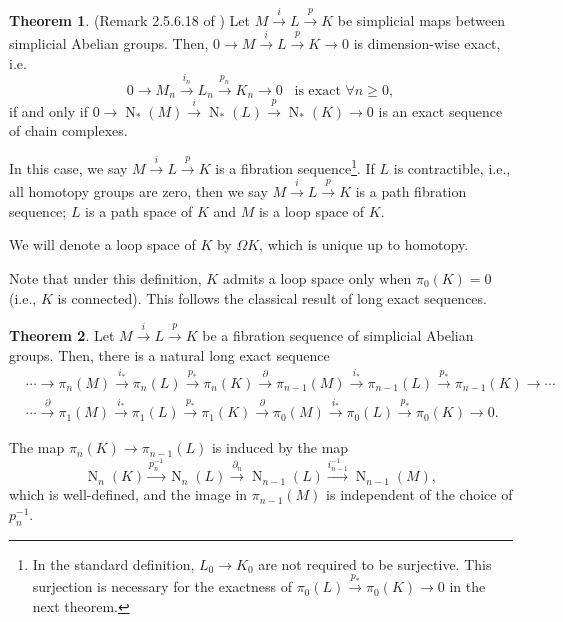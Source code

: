 \documentclass[reprint, amsmath, amssymb, showpacs, floatfix, longbibliography, aps, twocolumn, superscriptaddress, nofootinbib]{revtex4-2}
\theoremstyle{definition}
\newtheorem{theorem}{Theorem}[section]
\begin{document}
\begin{theorem}\label{thmFibration}
	(Remark 2.5.6.18 of \cite{kerodon}) Let $M\xrightarrow{i}L\xrightarrow{p}K$ be simplicial maps between simplicial Abelian groups. Then, $0\rightarrow M\xrightarrow{i}L\xrightarrow{p}K\rightarrow0$ is dimension-wise exact, i.e.
	\begin{equation}
		0\rightarrow M_n\xrightarrow{i_n} L_n\xrightarrow{p_n} K_n\rightarrow 0\;\;\;\text{is exact }\forall n\ge 0,
	\end{equation}
	 if and only if $0\rightarrow \operatorname{N}_*(M)\xrightarrow{i} \operatorname{N}_*(L)\xrightarrow{p} \operatorname{N}_*(K)\rightarrow 0$ is an exact sequence of chain complexes.
	
	 In this case, we say $M\xrightarrow{i}L\xrightarrow{p}K$ is a fibration sequence\footnote{In the standard definition, $L_0\rightarrow K_0$ are not required to be surjective. This surjection is necessary for the exactness of $\pi_{0}(L)\xrightarrow{p_*}\pi_{0}(K)\longrightarrow 0$ in the next theorem.}. If $L$ is contractible, i.e., all homotopy groups are zero, then we say $M\xrightarrow{i}L\xrightarrow{p}K$ is a path fibration sequence; $L$ is a path space of $K$ and $M$ is a loop space of $K$.
\end{theorem}

We will denote a loop space of $K$ by $\Omega K$, which is unique up to homotopy.

Note that under this definition, $K$ admits a loop space only when $\pi_0(K)=0$ (i.e., $K$ is connected). This follows the classical result of long exact sequences.

\begin{theorem}
	Let $M\xrightarrow{i}L\xrightarrow{p}K$ be a fibration sequence of simplicial Abelian groups. Then, there is a natural long exact sequence
	\begin{equation}
		\begin{aligned}
			&\cdots \longrightarrow
			\pi_{n}(M)\xrightarrow{i_*}\pi_{n}(L)\xrightarrow{p_*}\pi_{n}(K)
			\xrightarrow{\;\partial\;}\pi_{n-1}(M)\xrightarrow{i_*}\pi_{n-1}(L)\xrightarrow{p_*}\pi_{n-1}(K)
			\longrightarrow \cdots\\[2pt]
			&\cdots \xrightarrow{\;\partial\;}\pi_{1}(M)\xrightarrow{i_*}\pi_{1}(L)\xrightarrow{p_*}\pi_{1}(K)
			\xrightarrow{\;\partial\;}\pi_{0}(M)\xrightarrow{i_*}\pi_{0}(L)\xrightarrow{p_*}\pi_{0}(K)\longrightarrow 0.
		\end{aligned}
	\end{equation}
	
	The map $\pi_n(K)\rightarrow\pi_{n-1}(L)$ is induced by the map
	\begin{equation}
		\operatorname{N}_n(K)\xrightarrow{p_n^{-1}}\operatorname{N}_n(L)\xrightarrow{\partial_n}\operatorname{N}_{n-1}(L)\xrightarrow{i_{n-1}^{-1}}\operatorname{N}_{n-1}(M),
	\end{equation}
	which is well-defined, and the image in $\pi_{n-1}(M)$ is independent of the choice of $p_n^{-1}$.
\end{theorem}
\end{document}
